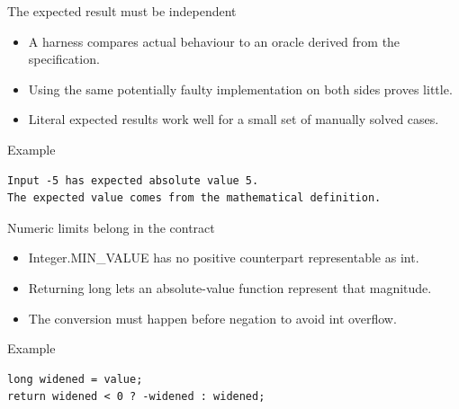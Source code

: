 \documentclass[10pt,aspectratio=169]{beamer}
\begin{document}
\begin{frame}[fragile,t]{The expected result must be independent}
\begin{itemize}
\item A harness compares actual behaviour to an oracle derived from the specification.
\item Using the same potentially faulty implementation on both sides proves little.
\item Literal expected results work well for a small set of manually solved cases.
\end{itemize}
\vspace{1mm}\begin{block}{Example}
\begin{lstlisting}
Input -5 has expected absolute value 5.
The expected value comes from the mathematical definition.
\end{lstlisting}
\end{block}
\end{frame}

\begin{frame}[fragile,t]{Numeric limits belong in the contract}
\begin{itemize}
\item Integer.MIN\_VALUE has no positive counterpart representable as int.
\item Returning long lets an absolute-value function represent that magnitude.
\item The conversion must happen before negation to avoid int overflow.
\end{itemize}
\vspace{1mm}\begin{block}{Example}
\begin{lstlisting}
long widened = value;
return widened < 0 ? -widened : widened;
\end{lstlisting}
\end{block}
\end{frame}
\end{document}
